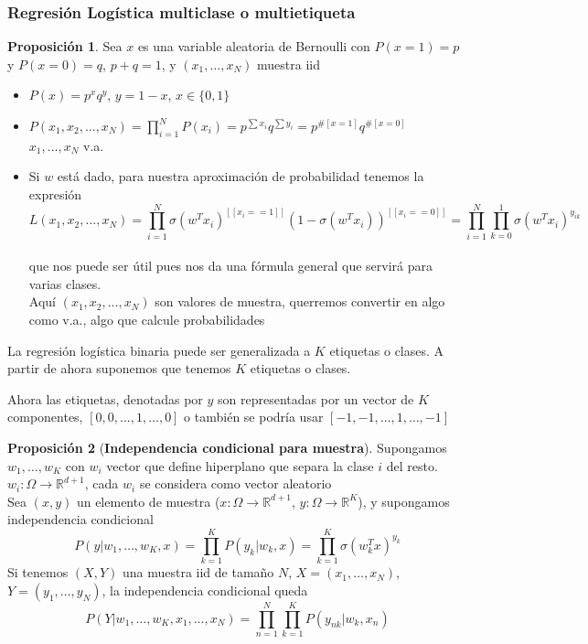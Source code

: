 \documentclass[11pt,a4paper]{article}
\theoremstyle{definition}
\newtheorem{proposition}{Proposición}[section]
\newcommand{\R}{\mathbb{R}}
\begin{document}
	\subsubsection{Regresión Logística multiclase o multietiqueta}
	\begin{proposition}
		Sea $x$ es una variable aleatoria de Bernoulli con $P(x=1)=p$ y $P(x=0)=q$, $p+q=1$, y $(x_1,\ldots,x_N)$ muestra iid
		\begin{itemize}
		\item $P(x)=p^xq^y$, $y=1-x$, $x\in \{0,1\}$
		\item $P(x_1,x_2,\ldots, x_N)=\prod_{i=1}^N P(x_i)=p^{\sum x_i} q^{\sum y_i}=p^{\#[x=1]} q^{\#[x=0]}$\\
		$x_1,\ldots,x_N$ v.a.
		\item Si $w$ está dado, para nuestra aproximación de probabilidad tenemos la expresión $$L(x_1,x_2,\ldots, x_N)=\prod_{i=1}^N \sigma(w^T x_i)^{[[x_i==1]]} (1-\sigma(w^Tx_i))^{[[x_i==0]]}=\prod_{i=1}^N \prod_{k=0}^1 \sigma (w^T x_i)^{y_{ik}}$$\\ que nos puede ser útil pues nos da una fórmula general que servirá para varias clases.\\ Aquí $(x_1,x_2,\ldots, x_N)$ son valores de muestra, querremos convertir en algo como v.a., algo que calcule probabilidades
		\end{itemize}
	\end{proposition}
	
	La regresión logística binaria puede ser generalizada a $K$ etiquetas o clases. A partir de ahora suponemos que tenemos $K$ etiquetas o clases.
	
	Ahora las etiquetas, denotadas por $y$ son representadas por un vector de $K$ componentes, $[0,0,\ldots,1,\ldots ,0]$ o también se podría usar $[-1,-1,\ldots,1,\ldots,-1]$
	
	\begin{proposition}[\bf Independencia condicional para muestra]
		Supongamos $w_1,\ldots, w_K$ con $w_i$ vector que define hiperplano que separa la clase $i$ del resto. $w_i\colon \Omega \to \R^{d+1}$, cada $w_i$ se considera como vector aleatorio \\
		Sea $(x,y)$ un elemento de muestra ($x\colon \Omega \to \R^{d+1}$, $y\colon \Omega \to \R^K$), y supongamos independencia condicional
		$$P(y| w_1,\ldots , w_K,x)=\prod_{k=1}^K P(y_k | w_k, x)= \prod_{k=1}^K \sigma(w_k^T x)^{y_k}$$
		Si tenemos $(X,Y)$ una muestra iid de tamaño $N$, $X=(x_1,\ldots,x_N)$, $Y=(y_1,\ldots,y_N)$, la independencia condicional queda
		$$P(Y|w_1,\ldots,w_K, x_1,\ldots,x_N)=\prod_{n=1}^N\prod_{k=1}^K P(y_{nk} |w_k,x_n)$$
	\end{proposition}
	
\end{document}
